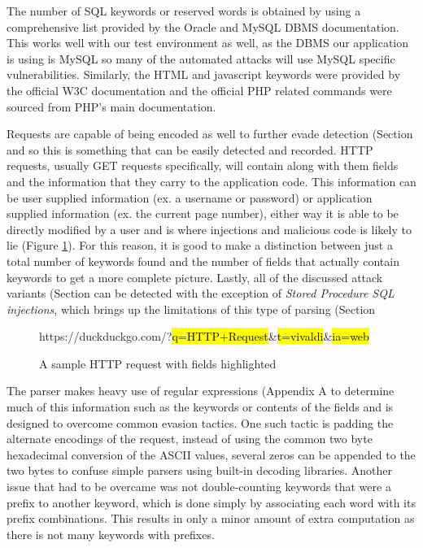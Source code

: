 The number of SQL keywords or reserved words is obtained by using a comprehensive list provided by the Oracle and MySQL DBMS documentation. %
This works well with our test environment as well, as the DBMS our application is using is MySQL so many of the automated attacks will use MySQL specific vulnerabilities.  Similarly, the HTML and javascript keywords were provided by the official W3C documentation and the official PHP related commands were sourced from PHP's main documentation.  %

Requests are capable of being encoded as well to further evade detection (Section %
and so this is something that can be easily detected and recorded.  HTTP requests, usually GET requests specifically, will contain along with them fields and the information that they carry to the application code.  This information can be user supplied information (ex. a username or password) or application supplied information (ex. the current page number), either way it is able to be directly modified by a user and is where injections and malicious code is likely to lie (Figure \ref{fig:sampleRequest}).  For this reason, it is good to make a distinction between just a total number of keywords found and the number of fields that actually contain keywords to get a more complete picture.  Lastly, all of the discussed attack variants (Section %
can be detected with the exception of \emph{Stored Procedure SQL injections}, which brings up the limitations of this type of parsing (Section %

\begin{figure}
	\centering
	\label{fig:sampleRequest}
	https://duckduckgo.com/?\hl{q=HTTP+Request}\&\hl{t=vivaldi}\&\hl{ia=web}
	\caption{A sample HTTP request with fields highlighted}
\end{figure}

The parser makes heavy use of regular expressions (Appendix A %
to determine much of this information such as the keywords or contents of the fields and is designed to overcome common evasion tactics.  One such tactic is padding the alternate encodings of the request, instead of using the common two byte hexadecimal conversion of the ASCII values, several zeros can be appended to the two bytes to confuse simple parsers using built-in decoding libraries.  Another issue that had to be overcame was not double-counting keywords that were a prefix to another keyword, which is done simply by associating each word with its prefix combinations.  This results in only a minor amount of extra computation as there is not many keywords with prefixes.


